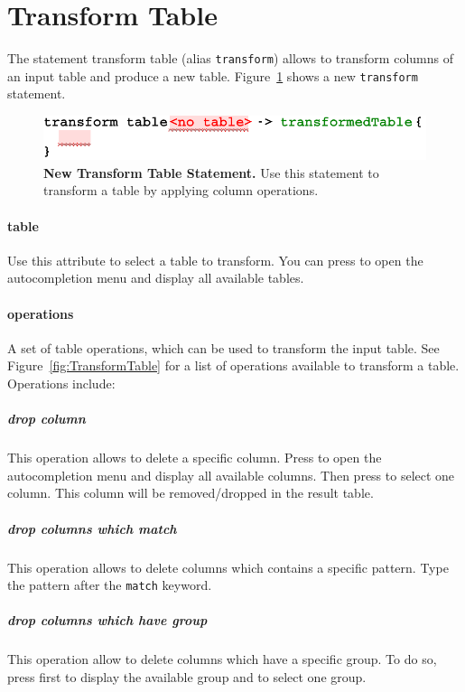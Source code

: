 \section{Transform Table}
The statement transform table (alias \texttt{transform})  allows to transform columns of an input table and produce a new table. Figure~\ref{fig:NewTransformTable} shows a new \texttt{transform} statement.

\begin{figure}[h!tbp]
  \centering
  \includegraphics[width=\figWidthNarrow]{figures/NewTransformTable.pdf}
\caption[New Transform Table  Statement.]{\textbf{New Transform Table Statement.} Use this statement to transform a table by applying column operations.}
\label{fig:NewTransformTable}
\end{figure}

\paragraph{table}
Use this attribute to select a table to transform. You can press \keys{\ctrl+\space} to open the autocompletion menu and display all available tables.

\paragraph{operations}
A set of table operations, which can be used to transform the input table. See Figure~\ref{fig:TransformTable} for a list of operations  available to transform a table. Operations include: 

\subparagraph{drop column} This operation allows to delete a specific column. Press \keys{\ctrl+\space} to open the autocompletion menu and display all available columns. Then press  \keys{\return} to select one column. This column will be removed/dropped in the result table.

\subparagraph{drop columns which match} This operation allows to delete columns which contains a specific pattern. Type the pattern after the \texttt{match} keyword.

\subparagraph{drop columns which have group} This operation allow to delete columns which have a specific group. To do so, press first  to display the available group and \keys{\return} to select one group.


